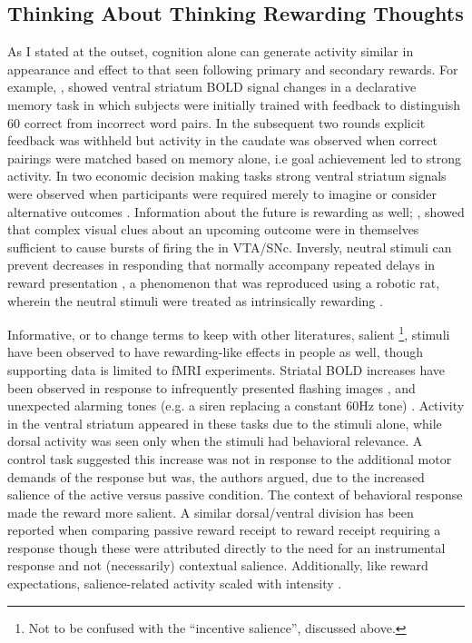 \documentclass[doc,12pt]{apa}        %
\begin{document}
\subsection{Thinking About Thinking Rewarding Thoughts}
\label{sub:cogrew}
As I stated at the outset, cognition alone can generate activity similar in appearance and effect to that seen following primary and secondary rewards.  For example, , showed ventral striatum BOLD signal changes in a declarative memory task in which subjects were initially trained with feedback to distinguish 60 correct from incorrect word pairs.  In the subsequent two rounds explicit feedback was withheld but activity in the caudate was observed when correct pairings were matched based on memory alone, i.e goal achievement led to strong activity.  In two economic decision making tasks strong ventral striatum signals were observed when participants were required merely to imagine or consider alternative outcomes  \cite{Hayden:2009p6545, Lohrenz:2007p7240}.  Information about the future is rewarding as well; , showed that complex visual clues about an upcoming outcome were in themselves sufficient to cause bursts of firing the in VTA/SNc.  Inversly, neutral stimuli can prevent decreases in responding that normally accompany repeated delays in reward presentation \cite{Reed:1992p9094}, a phenomenon that was reproduced using a robotic rat, wherein the neutral stimuli were treated as intrinsically rewarding \cite{Fiore:2008p7249}.

Informative, or to change terms to keep with other literatures, salient
\footnote{
    Not to be confused with the ``incentive salience'', discussed above.
}, stimuli have been observed to have rewarding-like effects in people as well, though supporting data is limited to fMRI experiments.  Striatal BOLD increases have been observed in response to infrequently presented flashing images \cite{Zink:2003p5107}, and unexpected alarming tones (e.g. a siren replacing a constant 60Hz tone) \cite{Zink:2006p7210}.  Activity in the ventral striatum appeared in these tasks due to the stimuli alone, while dorsal activity was seen only when the stimuli had behavioral relevance.  A control task suggested this increase was not in response to the additional motor demands of the response but was, the authors argued, due to the increased salience of the active versus passive condition.  The context of behavioral response made the reward more salient.  A similar dorsal/ventral division has been reported when comparing passive reward receipt to reward receipt requiring a response \cite{ODoherty:2006p2875} though these were attributed directly to the need for an instrumental response and not (necessarily) contextual salience.  Additionally, like reward expectations, salience-related activity scaled with intensity \cite{Zink:2006p7210}.
\end{document}
